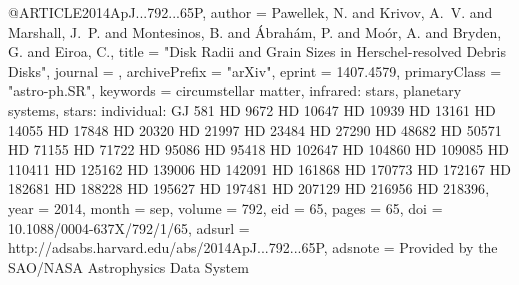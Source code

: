 @ARTICLE{2014ApJ...792...65P,
   author = {{Pawellek}, N. and {Krivov}, A.~V. and {Marshall}, J.~P. and 
    {Montesinos}, B. and {{\'A}brah{\'a}m}, P. and {Mo{\'o}r}, A. and 
    {Bryden}, G. and {Eiroa}, C.},
    title = "{Disk Radii and Grain Sizes in Herschel-resolved Debris Disks}",
  journal = {\apj},
archivePrefix = "arXiv",
eprint = {1407.4579},
primaryClass = "astro-ph.SR",
keywords = {circumstellar matter, infrared: stars, planetary systems, stars: individual: GJ 581 HD 9672 HD 10647 HD 10939 HD 13161 HD 14055 HD 17848 HD 20320 HD 21997 HD 23484 HD 27290 HD 48682 HD 50571 HD 71155 HD 71722 HD 95086 HD 95418 HD 102647 HD 104860 HD 109085 HD 110411 HD 125162 HD 139006 HD 142091 HD 161868 HD 170773 HD 172167 HD 182681 HD 188228 HD 195627 HD 197481 HD 207129 HD 216956 HD 218396},
year = 2014,
month = sep,
volume = 792,
eid = {65},
pages = {65},
doi = {10.1088/0004-637X/792/1/65},
adsurl = {http://adsabs.harvard.edu/abs/2014ApJ...792...65P},
adsnote = {Provided by the SAO/NASA Astrophysics Data System}
}
